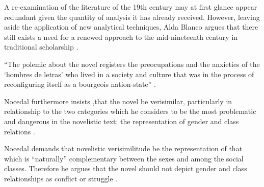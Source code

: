 \documentclass[12pt]{article}
\title{}
\makeatletter
\newcommand\iraggedright{%
	\let\\\@centercr\@rightskip\@flushglue \rightskip\@rightskip
	\leftskip\z@skip}
\makeatother
\begin{document}
	\makeheader
	\iraggedright
	
A re-examination of the literature of the 19th century may at first glance appear redundant given the quantity of analysis it has already received. 
However, leaving aside the application of new analytical techniques, Alda Blanco argues that there still exists a need for a renewed approach to the mid-nineteenth century in traditional scholarship \cite[423]{Blanco2000}.

\enquote{The polemic about the novel registers the preocupations and the anxieties of the \enquote{hombres de letras} who lived in a society and culture that was in the process of reconfiguring itself as a bourgeois nation-state} \cite[429]{Blanco2000}.

Nocedal furthermore insists ,that the novel be verisimilar, particularly in relationship to the two categories which he considers to be the most
problematic and dangerous in the novelistic text: the representation of gender and class relations \cite[430]{Blanco2000}.

Nocedal demands that novelistic verisimilitude be the representation of that which is “naturally” complementary between the sexes and among the social classes. 
Therefore he argues that the novel should not depict gender and class relationships as conflict or struggle \cite[430]{Blanco2000}.


\makeworkscited
\listoftodos
\end{document}
